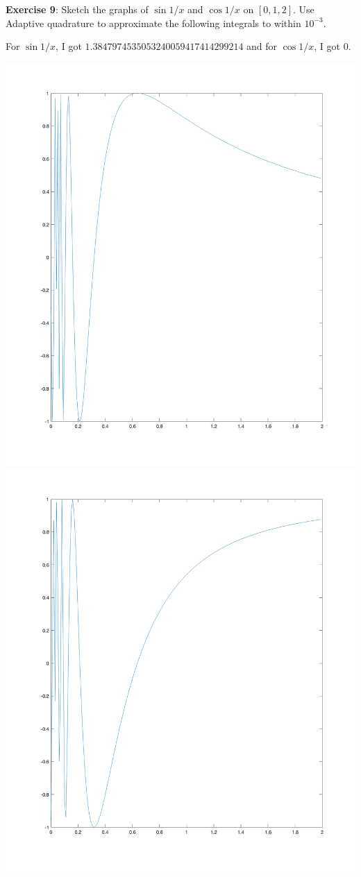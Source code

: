 \documentclass{article}
\begin{document}
\textbf{Exercise 9}: Sketch the graphs of $\sin{1 / x}$ and $\cos{1 / x}$ on $[0, 1, 2]$. Use Adaptive quadrature to approximate the following integrals to within $10^{-3}$.
    \begin{answer}
        For $\sin{1 / x}$, I got $1.3847974535053240059417414299214$ and for $\cos{1 / x}$, I got $0$.
        \begin{center}
            \includegraphics[scale=0.1]{sin1overx}
            \includegraphics[scale=0.1]{cos1overx}

\end{center}
\end{answer}
\end{document}
